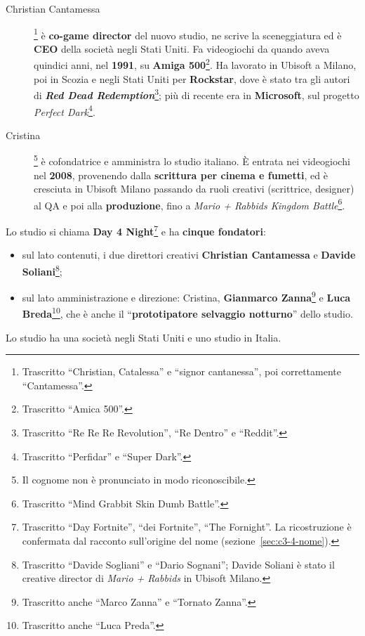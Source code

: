 \begin{description}
  \item[Christian Cantamessa]\footnote{Trascritto ``Christian, Catalessa'' e
        ``signor cantanessa'', poi correttamente ``Cantamessa''.} è
        \textbf{co-game director} del nuovo studio, ne scrive la sceneggiatura ed
        è \textbf{CEO} della società negli Stati Uniti. Fa videogiochi da quando
        aveva quindici anni, nel \textbf{1991}, su \textbf{Amiga
        500}\footnote{Trascritto ``Amica 500''.}. Ha lavorato in Ubisoft a
        Milano, poi in Scozia e negli Stati Uniti per \textbf{Rockstar}, dove è
        stato tra gli autori di \textbf{\emph{Red Dead
        Redemption}}\footnote{Trascritto ``Re Re Re Revolution'', ``Re Dentro'' e
        ``Reddit''.}; più di recente era in \textbf{Microsoft}, sul progetto
        \emph{Perfect Dark}\footnote{Trascritto ``Perfidar'' e ``Super Dark''.}.
  \item[Cristina]\footnote{Il cognome non è pronunciato in modo riconoscibile.}
        è cofondatrice e amministra lo studio italiano. È entrata nei videogiochi
        nel \textbf{2008}, provenendo dalla \textbf{scrittura per cinema e
        fumetti}, ed è cresciuta in Ubisoft Milano passando da ruoli creativi
        (scrittrice, designer) al QA e poi alla \textbf{produzione}, fino a
        \emph{Mario + Rabbids Kingdom Battle}\footnote{Trascritto ``Mind Grabbit
        Skin Dumb Battle''.}.
\end{description}

Lo studio si chiama \textbf{Day 4 Night}\footnote{Trascritto ``Day Fortnite'',
``dei Fortnite'', ``The Fornight''. La ricostruzione è confermata dal racconto
sull'origine del nome (sezione~\ref{sec:c3-4-nome}).} e ha \textbf{cinque
fondatori}:
\begin{itemize}
  \item sul lato contenuti, i due direttori creativi \textbf{Christian Cantamessa}
        e \textbf{Davide Soliani}\footnote{Trascritto ``Davide Sogliani'' e
        ``Dario Sognani''; Davide Soliani è stato il creative director di
        \emph{Mario + Rabbids} in Ubisoft Milano.};
  \item sul lato amministrazione e direzione: Cristina, \textbf{Gianmarco
        Zanna}\footnote{Trascritto anche ``Marco Zanna'' e ``Tornato Zanna''.} e
        \textbf{Luca Breda}\footnote{Trascritto anche ``Luca Preda''.}, che è
        anche il ``\textbf{prototipatore selvaggio notturno}'' dello studio.
\end{itemize}
Lo studio ha una società negli Stati Uniti e uno studio in Italia.


